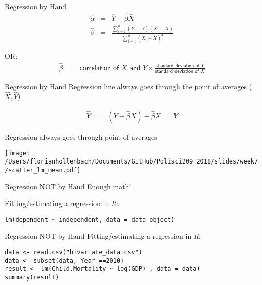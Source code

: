 \documentclass[presentation]{beamer}
\begin{document}
\begin{frame}[label={sec:org70ea081}]{Regression by Hand}
\begin{eqnarray*}
  \hat\alpha & = & \bar{Y} - \hat\beta \bar{X} \\
  \hat\beta & = & \frac{\sum_{i=1}^n (Y_i - \overline{Y})(X_i - \overline{X})}{\sum_{i=1}^n (X_i - \overline{X})^2}
    \end{eqnarray*}

OR:
\pause
\begin{eqnarray*}
      \hat\beta & = & \textsf{correlation of $X$ and $Y$} \times
                      \frac{\textsf{standard deviation of $Y$}}{\textsf{standard
                      deviation of $X$}}
    \end{eqnarray*}
\end{frame}


\begin{frame}[label={sec:org1d8ff4c}]{Regression by Hand}
Regression line always goes through the point of averages (\(\hat{X},\hat{Y}\))

\begin{eqnarray*}
   \widehat{Y}  & = & (\overline{Y} - \hat\beta \overline{X}) + \hat\beta \overline{X} \ =
                    \ \overline{Y}
\end{eqnarray*}
\end{frame}


\begin{frame}[label={sec:orgcc53eeb}]{Regression always goes through point of averages}
\begin{center}
\texttt{[image: /Users/florianhollenbach/Documents/GitHub/Polisci209\_2018/slides/week7/scatter\_lm\_mean.pdf]}
\end{center}
\end{frame}


\begin{frame}[fragile,label={sec:orgaf1dcd2}]{Regression NOT by Hand}
 \alert{Enough math!}

Fitting/estimating a regression in \emph{R}:

\begin{verbatim}
lm(dependent ~ independent, data = data_object)
\end{verbatim}
\end{frame}


\begin{frame}[fragile,label={sec:org7fa05fa}]{Regression NOT by Hand}
 \alert{Fitting/estimating a regression in \emph{R}:}

\begin{verbatim}
data <- read.csv("bivariate_data.csv")
data <- subset(data, Year ==2010)
result <- lm(Child.Mortality ~ log(GDP) , data = data)
summary(result)
\end{verbatim}
\end{frame}
\end{document}
